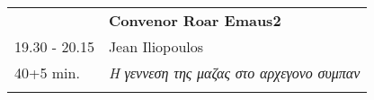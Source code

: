 \begin{longtable}{p{3cm}p{13cm}}
&\hfill {\bf Convenor Roar Emaus2 }\\ 
19.30 - 20.15 & Jean Iliopoulos\\ 
40+5 min. & {\it Η γεννεση της μαζας στο αρχεγονο συμπαν}\\ 
 & \\ 
\end{longtable}

